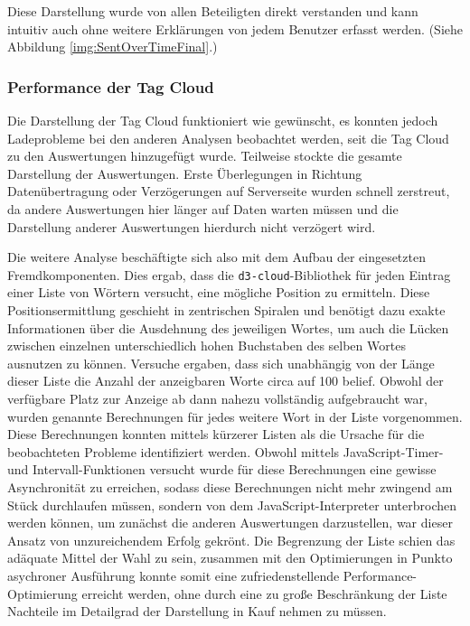 Diese Darstellung wurde von allen Beteiligten direkt verstanden und kann intuitiv auch ohne weitere Erklärungen von jedem Benutzer erfasst werden. (Siehe Abbildung \ref{img:SentOverTimeFinal}.)

\subsubsection{Performance der Tag Cloud}
Die Darstellung der Tag Cloud funktioniert wie gewünscht, es konnten jedoch Ladeprobleme bei den anderen Analysen beobachtet werden, seit die Tag Cloud zu den Auswertungen hinzugefügt wurde. Teilweise stockte die gesamte Darstellung der Auswertungen. Erste Überlegungen in Richtung Datenübertragung oder Verzögerungen auf Serverseite wurden schnell zerstreut, da andere Auswertungen hier länger auf Daten warten müssen und die Darstellung anderer Auswertungen hierdurch nicht verzögert wird.

Die weitere Analyse beschäftigte sich also mit dem Aufbau der eingesetzten Fremdkomponenten. Dies ergab, dass die \texttt{d3-cloud}-Bibliothek für jeden Eintrag einer Liste von Wörtern versucht, eine mögliche Position zu ermitteln. Diese Positionsermittlung geschieht in zentrischen Spiralen und benötigt dazu exakte Informationen über die Ausdehnung des jeweiligen Wortes, um auch die Lücken zwischen einzelnen unterschiedlich hohen Buchstaben des selben Wortes ausnutzen zu können. Versuche ergaben, dass sich unabhängig von der Länge dieser Liste die Anzahl der anzeigbaren Worte circa auf 100 belief. Obwohl der verfügbare Platz zur Anzeige ab dann nahezu vollständig aufgebraucht war, wurden genannte Berechnungen für jedes weitere Wort in der Liste vorgenommen. Diese Berechnungen konnten mittels kürzerer Listen als die Ursache für die beobachteten Probleme identifiziert werden. Obwohl mittels JavaScript-Timer- und Intervall-Funktionen versucht wurde für diese Berechnungen eine gewisse Asynchronität zu erreichen, sodass diese Berechnungen nicht mehr zwingend am Stück durchlaufen müssen, sondern von dem JavaScript-Interpreter unterbrochen werden können, um zunächst die anderen Auswertungen darzustellen, war dieser Ansatz von unzureichendem Erfolg gekrönt. Die Begrenzung der Liste schien das adäquate Mittel der Wahl zu sein, zusammen mit den Optimierungen in Punkto asychroner Ausführung konnte somit eine zufriedenstellende Performance-Optimierung erreicht werden, ohne durch eine zu große Beschränkung der Liste Nachteile im Detailgrad der Darstellung in Kauf nehmen zu müssen.

